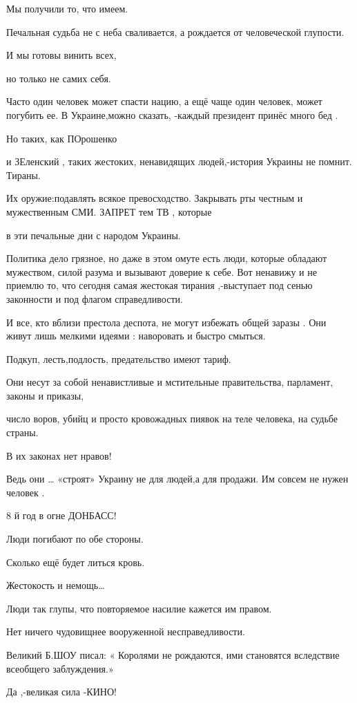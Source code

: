  Мы получили то, что имеем.

Печальная судьба не с неба сваливается, а рождается от человеческой глупости. 

И мы готовы винить всех, 

но только не самих себя.

Часто один человек может спасти нацию, а ещё чаще один человек, может погубить
ее.  В Украине,можно сказать, -каждый  президент принёс много бед .

Но таких, как ПОрошенко  

и ЗЕленский , таких жестоких, ненавидящих людей,-история Украины не помнит.
Тираны.

Их оружие:подавлять всякое превосходство. Закрывать рты честным и мужественным
СМИ.  ЗАПРЕТ тем ТВ , которые 

в эти печальные дни  с народом Украины.  

Политика дело грязное, но даже в этом омуте есть люди, которые обладают
мужеством, силой разума и вызывают доверие к себе. Вот ненавижу и не приемлю
то, что сегодня  самая жестокая тирания ,-выступает под сенью законности и под
флагом справедливости. 

И все, кто вблизи престола деспота, не могут избежать общей заразы . Они живут
лишь мелкими идеями : наворовать и быстро смыться.

Подкуп, лесть,подлость, предательство имеют тариф.

Они несут за собой ненавистливые и мстительные правительства, парламент, законы
и приказы,

число воров, убийц и просто кровожадных пиявок на теле человека, на судьбе
страны.  

В их законах нет нравов!

Ведь они … «строят» Украину не для людей,а для продажи. Им совсем не нужен
человек .

8 й год в огне ДОНБАСС! 

Люди погибают по обе стороны.  

Сколько ещё будет литься кровь. 

Жестокость и немощь… 

Люди так глупы, что повторяемое насилие кажется им правом. 

Нет ничего чудовищнее вооруженной несправедливости.

Великий  Б.ШОУ писал: « Королями не рождаются, ими становятся вследствие
всеобщего заблуждения.»

Да ,-великая сила -КИНО!

